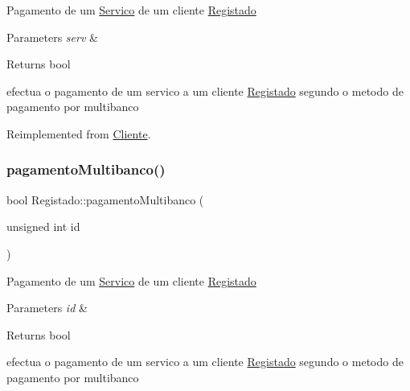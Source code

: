 Pagamento de um \hyperlink{class_servico}{Servico} de um cliente \hyperlink{class_registado}{Registado}


\begin{DoxyParams}{Parameters}
{\em serv} & \\
\hline
\end{DoxyParams}
\begin{DoxyReturn}{Returns}
bool
\end{DoxyReturn}
efectua o pagamento de um servico a um cliente \hyperlink{class_registado}{Registado} segundo o metodo de pagamento por multibanco 

Reimplemented from \hyperlink{class_cliente_a6e230e5e512bebe07bfa1ad6750b8cee}{Cliente}.

\hypertarget{class_registado_a3338ad6a9c5980671f2eb3b48d8798de}{}\label{class_registado_a3338ad6a9c5980671f2eb3b48d8798de} 
\subsubsection{\texorpdfstring{pagamento\+Multibanco()}{pagamentoMultibanco()}\hspace{0.1cm}{\footnotesize\ttfamily [2/2]}}
{\footnotesize\ttfamily bool Registado\+::pagamento\+Multibanco (\begin{DoxyParamCaption}\item[{unsigned int}]{id }\end{DoxyParamCaption})\hspace{0.3cm}{\ttfamily [virtual]}}

Pagamento de um \hyperlink{class_servico}{Servico} de um cliente \hyperlink{class_registado}{Registado}


\begin{DoxyParams}{Parameters}
{\em id} & \\
\hline
\end{DoxyParams}
\begin{DoxyReturn}{Returns}
bool
\end{DoxyReturn}
efectua o pagamento de um servico a um cliente \hyperlink{class_registado}{Registado} segundo o metodo de pagamento por multibanco \hypertarget{class_registado_af3c8f63f7df1cdfd27e44126f78b71d8}{}\label{class_registado_af3c8f63f7df1cdfd27e44126f78b71d8} 

